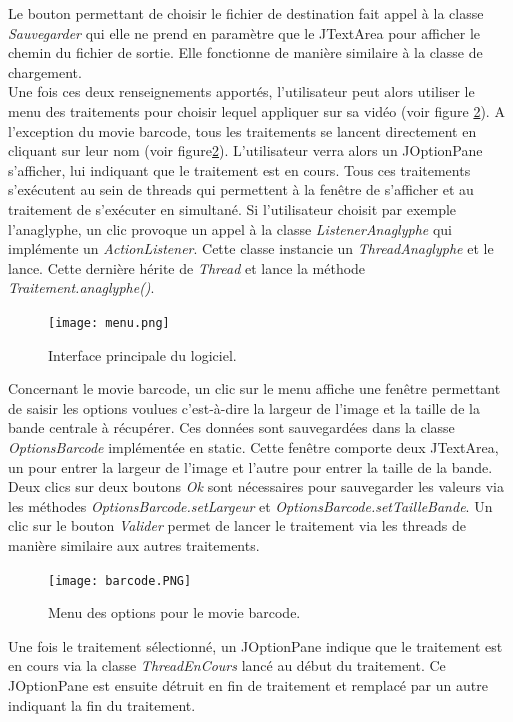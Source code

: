 \documentclass[10pt,a4paper]{article}
\begin{document}
Le bouton permettant de choisir le fichier de destination fait appel à la classe \textit{Sauvegarder} qui elle ne prend en paramètre que le JTextArea pour afficher le chemin du fichier de sortie. Elle fonctionne de manière similaire à la classe de chargement.\\

Une fois ces deux renseignements apportés, l'utilisateur peut alors utiliser le menu des traitements pour choisir lequel appliquer sur sa vidéo (voir figure \ref{menu}). A l'exception du movie barcode, tous les traitements se lancent directement en cliquant sur leur nom (voir figure\ref{menu}). L'utilisateur verra alors un JOptionPane s'afficher, lui indiquant que le traitement est en cours. Tous ces traitements s'exécutent au sein de threads qui permettent à la fenêtre de s'afficher et au traitement de s'exécuter en simultané. Si l'utilisateur choisit par exemple l'anaglyphe, un clic provoque un appel à la classe \textit{ListenerAnaglyphe} qui implémente un \textit{ActionListener}. Cette classe instancie un \textit{ThreadAnaglyphe} et le lance. Cette dernière hérite de \textit{Thread} et lance la méthode \textit{Traitement.anaglyphe()}. 

\begin{figure}[!h]
\center
\texttt{[image: menu.png]}
\caption{Interface principale du logiciel.}
\label{menu}
\end{figure}

Concernant le movie barcode, un clic sur le menu affiche une fenêtre permettant de saisir les options voulues c'est-à-dire la largeur de l'image et la taille de la bande centrale à récupérer. Ces données sont sauvegardées dans la classe \textit{OptionsBarcode} implémentée en static. Cette fenêtre comporte deux JTextArea, un pour entrer la largeur de l'image et l'autre pour entrer la taille de la bande. Deux clics sur deux boutons \textit{Ok} sont nécessaires pour sauvegarder les valeurs via les méthodes \textit{OptionsBarcode.setLargeur} et \textit{OptionsBarcode.setTailleBande}. Un clic sur le bouton \textit{Valider} permet de lancer le traitement via les threads de manière similaire aux autres traitements.

\begin{figure}[!h]
\center
\texttt{[image: barcode.PNG]}
\caption{Menu des options pour le movie barcode.}
\label{menu}
\end{figure}

Une fois le traitement sélectionné, un JOptionPane indique que le traitement est en cours via la classe \textit{ThreadEnCours} lancé au début du traitement. Ce JOptionPane est ensuite détruit en fin de traitement et remplacé par un autre indiquant la fin du traitement.
\end{document}
